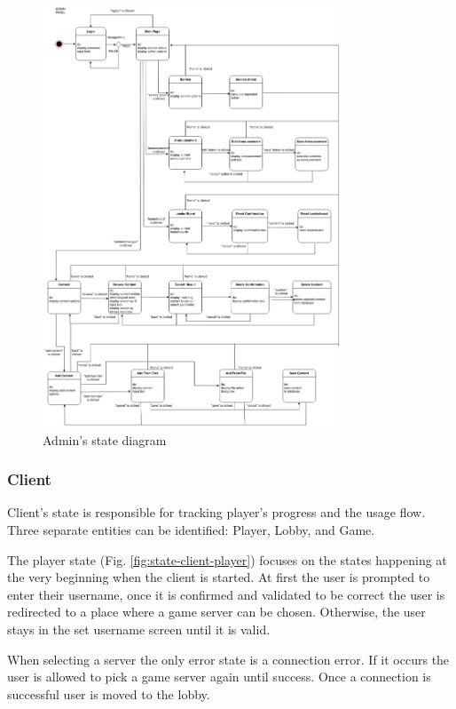 \documentclass[titlepage]{article}
\newcommand{\figref}[1]{{(Fig. \hypersetup{linkcolor=blue}\ref{#1})}}
\begin{document}
\begin{figure}[H]
	\centering
	\includegraphics[width=0.79\textwidth]{state_diagram_admin.png}
	\caption{Admin's state diagram}
	\label{fig:state-admin}
\end{figure}

\subsubsection{Client}

Client's state is responsible for tracking player's progress and the usage flow. Three separate entities can be identified: Player, Lobby, and Game.

The player state \figref{fig:state-client-player} focuses on the states happening at the very beginning when the client is started. At first the user is prompted to enter their username, once it is confirmed and validated to be correct the user is redirected to a place where a game server can be chosen. Otherwise, the user stays in the set username screen until it is valid.

When selecting a server the only error state is a connection error. If it occurs the user is allowed to pick a game server again until success. Once a connection is successful user is moved to the lobby.
\end{document}

